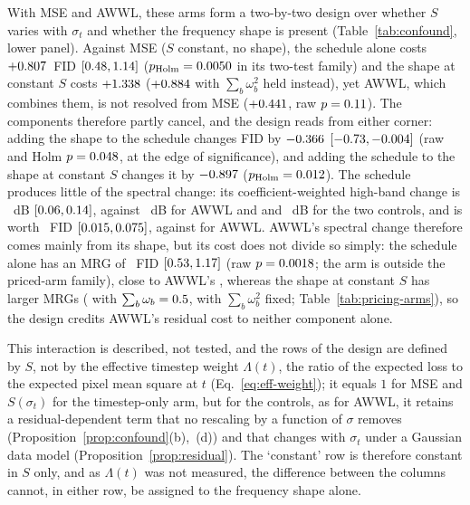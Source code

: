 With MSE and AWWL, these arms form a two-by-two design over whether $S$ varies
with $\sigma_t$ and whether the frequency shape is present
(Table~\ref{tab:confound}, lower panel). Against MSE
($S$ constant, no shape), the schedule alone costs $+0.807$~FID
$[0.48, 1.14]$ ($p_{\mathrm{Holm}} = 0.0050$ in its
two-test family) and the shape at constant $S$ costs $+1.338$
($+0.884$ with $\sum_b \omega_b^2$ held instead), yet AWWL, which
combines them, is not resolved from MSE ($+0.441$, raw $p = 0.11$). The
components therefore partly cancel, and the design reads from either corner:
adding the shape to the schedule changes FID by $-0.366$
$[-0.73, -0.004]$ (raw and Holm
$p = 0.048$, at the edge of significance), and adding the
schedule to the shape at constant $S$ changes it by $-0.897$
($p_{\mathrm{Holm}} = 0.012$). The schedule produces
little of the spectral change: its coefficient-weighted high-band change is
\corrHighWTimestep~dB $[0.06, 0.14]$, against
\corrHighWAWWL~dB for AWWL and \corrHighWSumFixed{} and \corrHighWSqFixed~dB
for the two controls, and is worth ~FID
$[0.015, 0.075]$, against \priceTransplantValue{} for
AWWL. AWWL's spectral change therefore comes mainly from its shape, but its
cost does not divide so simply: the schedule alone has an MRG of
\mrgTimestep~FID $[0.53, 1.17]$ (raw $p = 0.0018$;
the arm is outside the priced-arm family), close to AWWL's \mrgMain, whereas
the shape at constant $S$ has larger MRGs (\mrgArmSumFixed{} with
$\sum_b \omega_b = 0.5$, \mrgArmSqFixed{} with $\sum_b \omega_b^2$
fixed; Table~\ref{tab:pricing-arms}), so the design credits AWWL's residual
cost to neither component alone.

This interaction is described, not tested, and the rows of the design are
defined by $S$, not by the effective timestep weight $\Lambda(t)$, the ratio of
the expected loss to the expected pixel mean square at $t$
(Eq.~\eqref{eq:eff-weight}); it equals $1$ for MSE and
$S(\sigma_t)$ for the timestep-only arm, but for the controls, as for AWWL,
it retains a residual-dependent term that no rescaling by a function of
$\sigma$ removes (Proposition~\ref{prop:confound}(b),~(d)) and that changes
with $\sigma_t$ under a Gaussian data model (Proposition~\ref{prop:residual}).
The `constant' row is therefore constant in $S$ only, and as $\Lambda(t)$ was
not measured, the difference between the columns cannot, in either row, be
assigned to the frequency shape alone.

